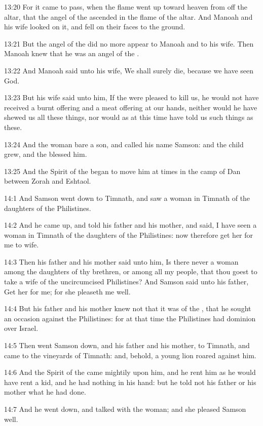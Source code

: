 13:20 For it came to pass, when the flame went up toward heaven from off the altar, that the angel of the \LORD ascended in the flame of the altar. And Manoah and his wife looked on it, and fell on their faces to the ground.

13:21 But the angel of the \LORD did no more appear to Manoah and to his wife. Then Manoah knew that he was an angel of the \LORD.

13:22 And Manoah said unto his wife, We shall surely die, because we have seen God.

13:23 But his wife said unto him, If the \LORD were pleased to kill us, he would not have received a burnt offering and a meat offering at our hands, neither would he have shewed us all these things, nor would as at this time have told us such things as these.

13:24 And the woman bare a son, and called his name Samson: and the child grew, and the \LORD blessed him.

13:25 And the Spirit of the \LORD began to move him at times in the camp of Dan between Zorah and Eshtaol.

14:1 And Samson went down to Timnath, and saw a woman in Timnath of the daughters of the Philistines.

14:2 And he came up, and told his father and his mother, and said, I have seen a woman in Timnath of the daughters of the Philistines: now therefore get her for me to wife.

14:3 Then his father and his mother said unto him, Is there never a woman among the daughters of thy brethren, or among all my people, that thou goest to take a wife of the uncircumcised Philistines? And Samson said unto his father, Get her for me; for she pleaseth me well.

14:4 But his father and his mother knew not that it was of the \LORD, that he sought an occasion against the Philistines: for at that time the Philistines had dominion over Israel.

14:5 Then went Samson down, and his father and his mother, to Timnath, and came to the vineyards of Timnath: and, behold, a young lion roared against him.

14:6 And the Spirit of the \LORD came mightily upon him, and he rent him as he would have rent a kid, and he had nothing in his hand: but he told not his father or his mother what he had done.

14:7 And he went down, and talked with the woman; and she pleased Samson well.


